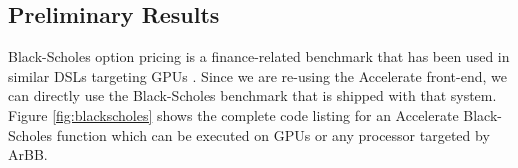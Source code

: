 \subsection{Preliminary Results}









Black-Scholes option pricing is a finance-related benchmark that has been used in similar
DSLs targeting GPUs . Since we are re-using the 
Accelerate front-end, we can directly use the Black-Scholes benchmark that 
is shipped with that system.  Figure \ref{fig:blackscholes} shows the
complete code listing for an Accelerate Black-Scholes function which
can be executed on GPUs or any processor targeted by ArBB.

%


